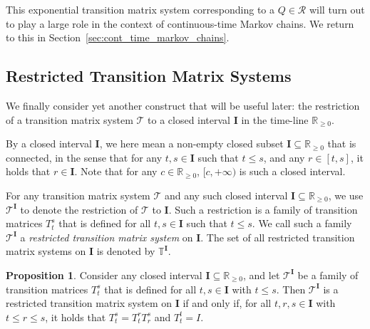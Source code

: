 \documentclass[10pt,a4paper]{paper}
\theoremstyle{definition}
\newtheorem{proposition}[theorem]{Proposition}
\newcommand{\reals}{\mathbb{R}}
\newcommand{\realsnonneg}{\reals_{\geq 0}}
\newcommand{\coloneqq}{:\!=}
\begin{document}
This exponential transition matrix system corresponding to a $Q\in\mathcal{R}$ will turn out to play a large role in the context of continuous-time Markov chains. We return to this in Section~\ref{sec:cont_time_markov_chains}.

\subsection{Restricted Transition Matrix Systems}\label{sec:restricted}

We finally consider yet another construct that will be useful later: the restriction of a transition matrix system $\mathcal{T}$ to a closed interval $\mathbf{I}$ in the time-line $\realsnonneg$.

By a closed interval $\mathbf{I}$, we here mean a non-empty closed subset $\mathbf{I}\subseteq\realsnonneg$ that is connected, in the sense that for any $t,s\in\mathbf{I}$ such that $t\leq s$, and any $r\in[t,s]$, it holds that $r\in\mathbf{I}$. Note that for any $c\in\realsnonneg$, $[c,+\infty)$ is such a closed interval.

For any transition matrix system $\mathcal{T}$ and any such closed interval $\mathbf{I}\subseteq\realsnonneg$, we use $\mathcal{T}^\mathbf{I}$ to denote the restriction of $\mathcal{T}$ to $\mathbf{I}$. Such a restriction is a family of transition matrices $T_t^s$ that is defined for all $t,s\in\mathbf{I}$ such that $t\leq s$.
We call such a family $\mathcal{T}^{\mathbf{I}}$ a \emph{restricted transition matrix system} on $\mathbf{I}$. The set of all restricted transition matrix systems on $\mathbf{I}$ is denoted by $\mathbb{T}^{\mathbf{I}}$.


\begin{proposition}\label{prop:restr_trans_mat_system_if_semigroup}
Consider any closed interval $\mathbf{I}\subseteq\realsnonneg$, and let $\mathcal{T}^{\mathbf{I}}$ be a family of transition matrices $T_t^s$ that is defined for all $t,s\in\mathbf{I}$ with $t\leq s$. Then $\mathcal{T}^{\mathbf{I}}$ is a restricted transition matrix system on $\mathbf{I}$ if and only if, for all $t,r,s\in\mathbf{I}$ with $t\leq r\leq s$, it holds that $T_t^s = T_t^rT_r^s$ and $T_t^t=I$.
\end{proposition}
\end{document}
